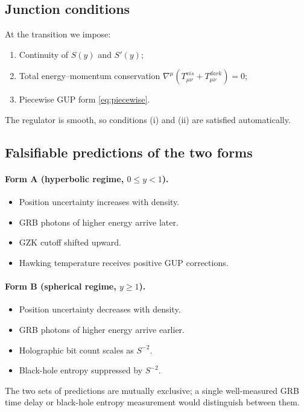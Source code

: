 \documentclass[12pt,oneside,openany]{book}
\begin{document}
\subsection{Junction conditions}

At the transition we impose:
\begin{enumerate}
\item Continuity of $S(y)$ and $S'(y)$;
\item Total energy--momentum conservation
$\nabla^{\mu}(T_{\mu\nu}^{vis}+T_{\mu\nu}^{dark})=0$;
\item Piecewise GUP form \eqref{eq:piecewise}.
\end{enumerate}
The regulator is smooth, so conditions (i) and (ii) are
satisfied automatically.

\subsection{Falsifiable predictions of the two forms}

\paragraph{Form A (hyperbolic regime, $0\le y<1$).}
\begin{itemize}
\item Position uncertainty increases with density.
\item GRB photons of higher energy arrive later.
\item GZK cutoff shifted upward.
\item Hawking temperature receives positive GUP corrections.
\end{itemize}

\paragraph{Form B (spherical regime, $y\ge 1$).}
\begin{itemize}
\item Position uncertainty decreases with density.
\item GRB photons of higher energy arrive earlier.
\item Holographic bit count scales as $S^{-2}$.
\item Black-hole entropy suppressed by $S^{-2}$.
\end{itemize}

The two sets of predictions are mutually exclusive; a single
well-measured GRB time delay or black-hole entropy measurement
would distinguish between them.
\end{document}
